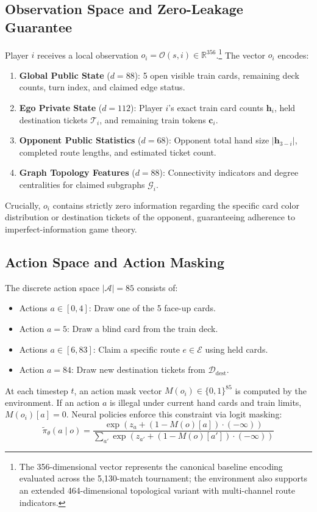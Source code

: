 \documentclass[conference,10pt]{IEEEtran}
\begin{document}
\subsection{Observation Space and Zero-Leakage Guarantee}
Player $i$ receives a local observation $o_i = \mathcal{O}(s, i) \in \mathbb{R}^{356}$.\footnote{The 356-dimensional vector represents the canonical baseline encoding evaluated across the 5,130-match tournament; the environment also supports an extended 464-dimensional topological variant with multi-channel route indicators.} The vector $o_i$ encodes:
\begin{enumerate}
    \item \textbf{Global Public State} ($d=88$): 5 open visible train cards, remaining deck counts, turn index, and claimed edge status.
    \item \textbf{Ego Private State} ($d=112$): Player $i$'s exact train card counts $\mathbf{h}_i$, held destination tickets $\mathcal{T}_i$, and remaining train tokens $\mathbf{c}_i$.
    \item \textbf{Opponent Public Statistics} ($d=68$): Opponent total hand size $|\mathbf{h}_{3-i}|$, completed route lengths, and estimated ticket count.
    \item \textbf{Graph Topology Features} ($d=88$): Connectivity indicators and degree centralities for claimed subgraphs $\mathcal{G}_i$.
\end{enumerate}
Crucially, $o_i$ contains strictly zero information regarding the specific card color distribution or destination tickets of the opponent, guaranteeing adherence to imperfect-information game theory.

\subsection{Action Space and Action Masking}
The discrete action space $|\mathcal{A}| = 85$ consists of:
\begin{itemize}
    \item Actions $a \in [0, 4]$: Draw one of the 5 face-up cards.
    \item Action $a = 5$: Draw a blind card from the train deck.
    \item Actions $a \in [6, 83]$: Claim a specific route $e \in \mathcal{E}$ using held cards.
    \item Action $a = 84$: Draw new destination tickets from $\mathcal{D}_{\text{dest}}$.
\end{itemize}
At each timestep $t$, an action mask vector $M(o_i) \in \{0, 1\}^{85}$ is computed by the environment. If an action $a$ is illegal under current hand cards and train limits, $M(o_i)[a] = 0$. Neural policies enforce this constraint via logit masking:
\begin{equation}
\tilde{\pi}_\theta(a \mid o) = \frac{\exp(z_a + (1 - M(o)[a]) \cdot (-\infty))}{\sum_{a'} \exp(z_{a'} + (1 - M(o)[a']) \cdot (-\infty))}
\end{equation}
\end{document}
